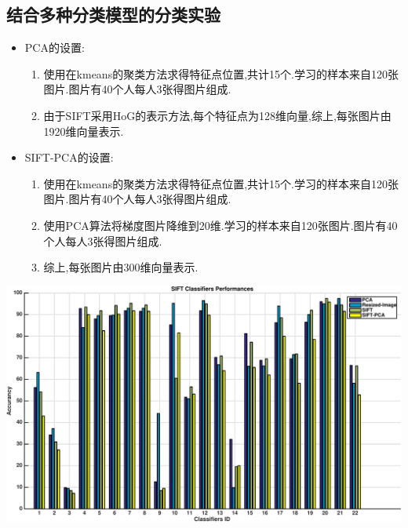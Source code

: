 \subsection{结合多种分类模型的分类实验}
\begin{itemize}
	\item PCA的设置:
		\begin{enumerate}
			\item 使用在kmeans的聚类方法求得特征点位置,共计15个.学习的样本来自120张图片.图片有40个人每人3张得图片组成.
			\item 由于SIFT采用HoG的表示方法,每个特征点为128维向量,综上,每张图片由1920维向量表示.
		\end{enumerate}
	\item SIFT-PCA的设置:
		\begin{enumerate}
			\item 使用在kmeans的聚类方法求得特征点位置,共计15个.学习的样本来自120张图片.图片有40个人每人3张得图片组成.
			\item 使用PCA算法将梯度图片降维到20维.学习的样本来自120张图片.图片有40个人每人3张得图片组成.
			\item 综上,每张图片由300维向量表示.
		\end{enumerate}
\end{itemize}

	\begin{center}
	\begin{minipage}[t]{\linewidth}
	\center
	{
	\captionsetup{justification=centering}
	\includegraphics[width=\textwidth]{Img/c3/pni_sift_res} 
	}
	\end{minipage}
	\medskip
	\end{center}
